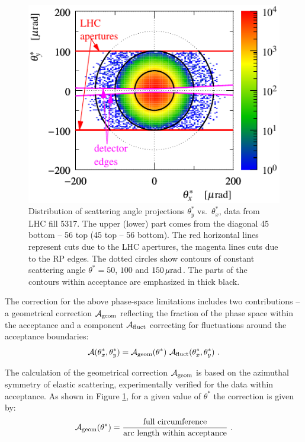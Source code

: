 \begin{figure}
\begin{center}
\includegraphics{fig/acc_phi_lab.pdf}
\caption{%
Distribution of scattering angle projections $\theta_y^*$ vs.~$\theta_x^*$, data from LHC fill 5317. The upper (lower) part comes from the diagonal 45 bottom -- 56 top (45 top -- 56 bottom). The red horizontal lines represent cuts due to the LHC apertures, the magenta lines cuts due to the RP edges. The dotted circles show contours of constant scattering angle $\theta^* = 50$, $100$ and $150\,{\rm \mu rad}$. The parts of the contours within acceptance are emphasized in thick black.
}
\label{fig:acc corr princ}
\end{center}
\end{figure}

The correction for the above phase-space limitations includes two contributions -- a geometrical correction $\mathcal{A}_{\rm geom}$ reflecting the fraction of the phase space within the acceptance and a component $\mathcal{A}_{\rm fluct}$ correcting for fluctuations around the acceptance boundaries:
\begin{equation}
\mathcal{A}(\theta^*_x, \theta_y^*) = \mathcal{A}_{\rm geom}(\theta^*)\ \mathcal{A}_{\rm fluct}(\theta^*_x, \theta_y^*)\ .
\end{equation}

The calculation of the geometrical correction $\mathcal{A}_{\rm geom}$ is based on the azimuthal symmetry of elastic scattering, experimentally verified for the data within acceptance. As shown in Figure \ref{fig:acc corr princ}, for a given value of $\theta^*$ the correction is given by:
\begin{equation}
\label{eq:acc geom}
\mathcal{A_{\rm geom}}(\theta^*) = {
	\hbox{full circumference}\over 
	\hbox{arc length within acceptance}
} \ .
\end{equation}

